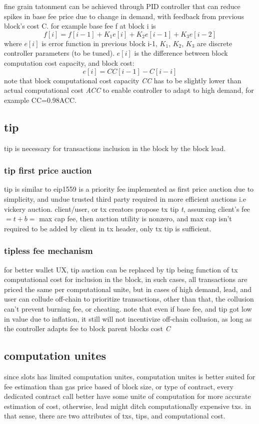 \documentclass{article}
\begin{document}
 fine grain tatonment can be achieved through PID controller that can reduce spikes in base fee price due to change in demand, with feedback from previous block's cost C.
 for example base fee f at block i is $$ f[i] = f[i-1] + K_1e[i] + K_2 e[i-1] + K_3e[i-2] $$
 where $e[i]$ is error function in previous block i-1, $K_1$, $K_2$, $K_3$ are discrete controller parameters (to be tuned).
 $e[i]$ is the difference between block computation cost capacity, and block cost:
 $$ e[i] = CC[i-1] - C[i-i]$$
 note that block computational cost capacity \emph{CC} has to be slightly lower than actual computational cost \emph{ACC} to enable controller to adapt to high demand, for example CC=0.98ACC.

 \subsection{tip}
 tip is necessary for transactions inclusion in the block by the block lead.

\subsubsection{ tip first price auction}
 tip is similar to eip1559 is a priority fee implemented as first price auction due to simplicity, and undue trusted third party required in more efficient auctions i.e vickery auction.
 client/user, or tx creators propose tx tip \emph{t}, assuming client's fee $ = t+b = $ max cap fee, then auction utility is nonzero, and max cap isn't required to be added by client in tx header, only tx tip is sufficient.

 \subsubsection {tipless fee mechanism}
for better wallet UX, tip auction can be replaced by tip being function of tx computational cost for inclusion in the block, in such cases, all transactions are priced the same per computational unite, but in cases of high demand, lead, and user can collude off-chain to prioritize transactions, other than that, the collusion can't prevent burning fee, or cheating.
note that even if base fee, and tip got low in value due to inflation, it still will not incentivize off-chain collusion, as long as the controller adapts fee to block parent blocks cost \emph{C}

\subsection{ computation unites}
since slots has limited computation unites, computation unites is better suited for fee estimation than gas price based of block size, or type of contract, every dedicated contract call better have some unite of computation for more accurate estimation of cost, otherwise, lead might ditch computationally expensive txs. in that sense, there are two attributes of txs, tips, and computational cost.
\end{document}
